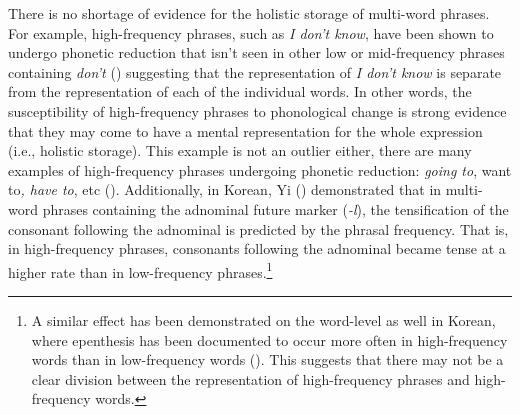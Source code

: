 \documentclass[
  12pt,
  letterpaper,
]{scrreport}
\begin{document}
There is no shortage of evidence for the holistic storage of multi-word
phrases. For example, high-frequency phrases, such as \emph{I don't
know}, have been shown to undergo phonetic reduction that isn't seen in
other low or mid-frequency phrases containing \emph{don't}
()
suggesting that the representation of \emph{I don't know} is separate
from the representation of each of the individual words. In other words,
the susceptibility of high-frequency phrases to phonological change is
strong evidence that they may come to have a mental representation for
the whole expression (i.e., holistic storage). This example is not an
outlier either, there are many examples of high-frequency phrases
undergoing phonetic reduction: \emph{going to}, want to\emph{, have to},
etc (). Additionally, in Korean, Yi
() demonstrated that in multi-word
phrases containing the adnominal future marker (\emph{-l}), the
tensification of the consonant following the adnominal is predicted by
the phrasal frequency. That is, in high-frequency phrases, consonants
following the adnominal became tense at a higher rate than in
low-frequency phrases.\footnote{A similar effect has been demonstrated
  on the word-level as well in Korean, where epenthesis has been
  documented to occur more often in high-frequency words than in
  low-frequency words
  (). This suggests that there may not be a clear
  division between the representation of high-frequency phrases and
  high-frequency words.}
\end{document}
